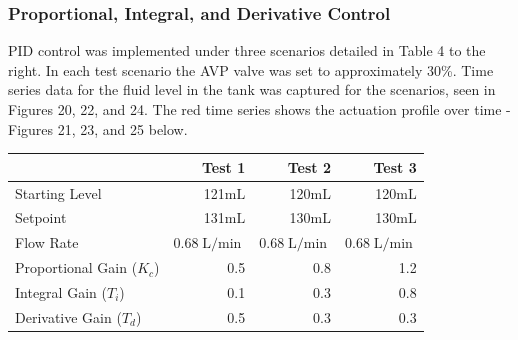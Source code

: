 \documentclass{article}
\begin{document}
\clearpage

\subsubsection{Proportional, Integral, and Derivative Control}

\begin{minipage}{0.4\textwidth}
	PID control was implemented under three scenarios detailed in Table 4 to the right. In each test scenario the AVP valve was set to approximately 30\%. Time series data for the fluid level in the tank was captured for the scenarios, seen in Figures 20, 22, and 24. The red time series shows the actuation profile over time - Figures 21, 23, and 25 below.
\end{minipage}
\hspace{0.5cm}
\begin{minipage}{0.45\textwidth}
	\small
	\begin{tabular}{lrrr}
		\toprule
		& Test 1 & Test 2 & Test 3 \\
		\midrule
		Starting Level & 121$\si{\milli\liter}$ & 120$\si{\milli\liter}$ & 120$\si{\milli\liter}$ \\
		Setpoint & 131$\si{\milli\liter}$ & 130$\si{\milli\liter}$ & 130$\si{\milli\liter}$ \\
		Flow Rate & 0.68$\si{\liter\per\min}$ & 0.68$\si{\liter\per\min}$ & 0.68$\si{\liter\per\min}$ \\
		Proportional Gain ($K_c$) & 0.5 & 0.8 & 1.2 \\
		Integral Gain ($T_i$) & 0.1 & 0.3 & 0.8 \\
		Derivative Gain ($T_d$) & 0.5 & 0.3 & 0.3 \\
		\bottomrule
	\end{tabular}
\end{minipage}
\end{document}
